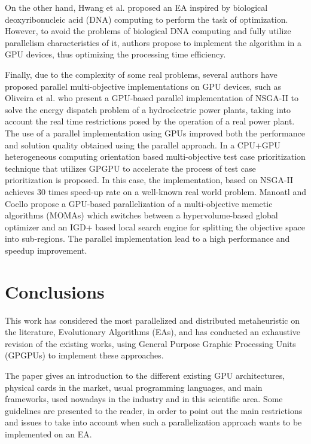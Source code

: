 \documentclass{article}
\begin{document}
On the other hand, Hwang et al. \cite{Hwang7470556} proposed an EA inspired by biological deoxyribonucleic acid (DNA) computing  to perform the task of optimization. However, to avoid the problems of biological DNA computing and fully utilize parallelism characteristics of it, authors propose to implement the algorithm in a GPU devices, thus optimizing the processing time efficiency.

Finally, due to the complexity of some real problems, several authors have proposed parallel multi-objective implementations on GPU devices, such as Oliveira et al. \cite{Oliveira7744337} who present a GPU-based parallel implementation of NSGA-II to solve the energy dispatch problem of a hydroelectric power plants, taking into account the real time restrictions posed by the operation of a real power plant. The use of a parallel implementation using GPUs improved both the performance and solution quality obtained using the parallel approach. 
In \cite{Bian2016} a CPU+GPU heterogeneous computing orientation based multi-objective test case prioritization technique that utilizes GPGPU to accelerate the process of test case prioritization is proposed. In this case, the implementation, based on NSGA-II achieves 30 times speed-up rate on a well-known real world problem.
Manoatl and Coello \cite{ManoatlLopez2016} propose a GPU-based
parallelization of a multi-objective memetic algorithms (MOMAs) which
switches between a hypervolume-based global optimizer and an IGD+
based local search engine for splitting the objective space into
sub-regions. The parallel implementation lead to a high performance
and speedup improvement.




\section{Conclusions}
\label{sec:conclusions}

This work has considered the most parallelized and distributed
metaheuristic on the literature, Evolutionary Algorithms (EAs), and
has conducted an exhaustive revision of the existing works, using
General Purpose Graphic Processing Units (GPGPUs) to implement these
approaches.  

The paper gives an introduction to the different existing GPU architectures, physical cards in the market, usual programming languages, and main frameworks, used nowadays in the industry and in this scientific area. 
Some guidelines are presented to the reader, in order to point out the main restrictions and issues to take into account when such a parallelization approach wants to be implemented on an EA.
\end{document}
